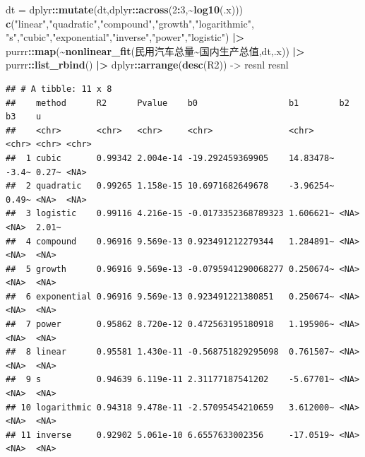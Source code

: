 \documentclass[
]{article}
\newenvironment{Shaded}{\begin{snugshade}}{\end{snugshade}}
\newcommand{\DecValTok}[1]{\textcolor[rgb]{0.00,0.00,0.81}{#1}}
\newcommand{\FunctionTok}[1]{\textcolor[rgb]{0.13,0.29,0.53}{\textbf{#1}}}
\newcommand{\NormalTok}[1]{#1}
\newcommand{\OtherTok}[1]{\textcolor[rgb]{0.56,0.35,0.01}{#1}}
\newcommand{\SpecialCharTok}[1]{\textcolor[rgb]{0.81,0.36,0.00}{\textbf{#1}}}
\newcommand{\StringTok}[1]{\textcolor[rgb]{0.31,0.60,0.02}{#1}}
\begin{document}
\begin{Shaded}
\begin{Highlighting}[]
\NormalTok{dt }\OtherTok{=}\NormalTok{ dplyr}\SpecialCharTok{::}\FunctionTok{mutate}\NormalTok{(dt,dplyr}\SpecialCharTok{::}\FunctionTok{across}\NormalTok{(}\DecValTok{2}\SpecialCharTok{:}\DecValTok{3}\NormalTok{,}\SpecialCharTok{\textasciitilde{}}\FunctionTok{log10}\NormalTok{(.x)))}
\FunctionTok{c}\NormalTok{(}\StringTok{"linear"}\NormalTok{,}\StringTok{"quadratic"}\NormalTok{,}\StringTok{"compound"}\NormalTok{,}\StringTok{"growth"}\NormalTok{,}\StringTok{"logarithmic"}\NormalTok{,}
  \StringTok{"s"}\NormalTok{,}\StringTok{"cubic"}\NormalTok{,}\StringTok{"exponential"}\NormalTok{,}\StringTok{"inverse"}\NormalTok{,}\StringTok{"power"}\NormalTok{,}\StringTok{"logistic"}\NormalTok{) }\SpecialCharTok{|\textgreater{}} 
\NormalTok{  purrr}\SpecialCharTok{::}\FunctionTok{map}\NormalTok{(}\SpecialCharTok{\textasciitilde{}}\FunctionTok{nonlinear\_fit}\NormalTok{(}\StringTok{\textquotesingle{}民用汽车总量\textasciitilde{}国内生产总值\textquotesingle{}}\NormalTok{,dt,.x)) }\SpecialCharTok{|\textgreater{}} 
\NormalTok{  purrr}\SpecialCharTok{::}\FunctionTok{list\_rbind}\NormalTok{() }\SpecialCharTok{|\textgreater{}} 
\NormalTok{  dplyr}\SpecialCharTok{::}\FunctionTok{arrange}\NormalTok{(}\FunctionTok{desc}\NormalTok{(R2)) }\OtherTok{{-}\textgreater{}}\NormalTok{ resnl}
\NormalTok{resnl}
\end{Highlighting}
\end{Shaded}

\begin{verbatim}
## # A tibble: 11 x 8
##    method      R2      Pvalue    b0                  b1        b2    b3    u    
##    <chr>       <chr>   <chr>     <chr>               <chr>     <chr> <chr> <chr>
##  1 cubic       0.99342 2.004e-14 -19.292459369905    14.83478~ -3.4~ 0.27~ <NA> 
##  2 quadratic   0.99265 1.158e-15 10.6971682649678    -3.96254~ 0.49~ <NA>  <NA> 
##  3 logistic    0.99116 4.216e-15 -0.0173352368789323 1.606621~ <NA>  <NA>  2.01~
##  4 compound    0.96916 9.569e-13 0.923491212279344   1.284891~ <NA>  <NA>  <NA> 
##  5 growth      0.96916 9.569e-13 -0.0795941290068277 0.250674~ <NA>  <NA>  <NA> 
##  6 exponential 0.96916 9.569e-13 0.923491221380851   0.250674~ <NA>  <NA>  <NA> 
##  7 power       0.95862 8.720e-12 0.472563195180918   1.195906~ <NA>  <NA>  <NA> 
##  8 linear      0.95581 1.430e-11 -0.568751829295098  0.761507~ <NA>  <NA>  <NA> 
##  9 s           0.94639 6.119e-11 2.31177187541202    -5.67701~ <NA>  <NA>  <NA> 
## 10 logarithmic 0.94318 9.478e-11 -2.57095454210659   3.612000~ <NA>  <NA>  <NA> 
## 11 inverse     0.92902 5.061e-10 6.6557633002356     -17.0519~ <NA>  <NA>  <NA>
\end{verbatim}
\end{document}

